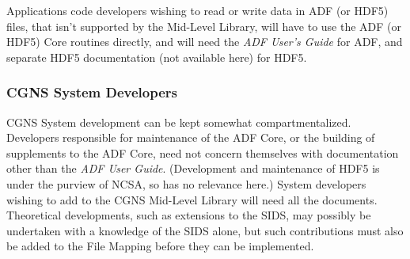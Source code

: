 Applications code developers wishing to read or write data in ADF (or
HDF5) files, that isn't supported by the Mid-Level Library, will have
to use the ADF (or HDF5) Core routines directly, and will need the
\textit{ADF User's Guide} for ADF, and separate HDF5 documentation (not
available here) for HDF5.

\subsubsection{CGNS System Developers}

CGNS System development can be kept somewhat compartmentalized.
Developers responsible for maintenance of the ADF Core, or the building
of supplements to the ADF Core, need not concern themselves with
documentation other than the \textit{ADF User Guide}.
(Development and maintenance of HDF5 is under the purview of NCSA, so
has no relevance here.)
System developers wishing to add to the CGNS Mid-Level Library will need
all the documents.
Theoretical developments, such as extensions to the SIDS, may possibly
be undertaken with a knowledge of the SIDS alone, but such contributions
must also be added to the File Mapping before they can be implemented.
